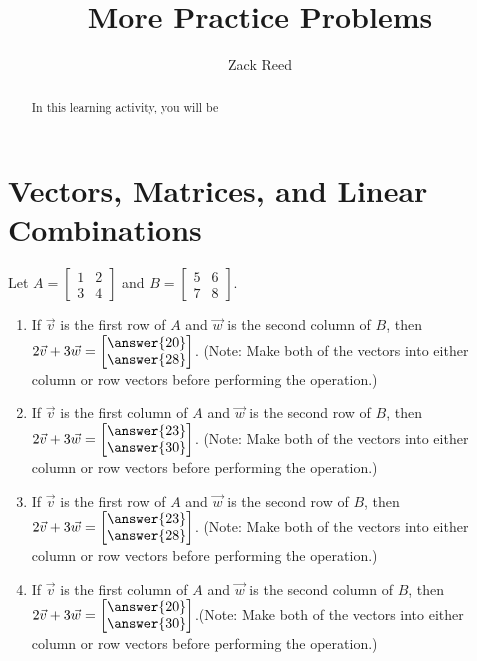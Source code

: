 \documentclass{ximera}
\author{Zack Reed}
\title{More Practice Problems}
\begin{document}
\begin{abstract}

    In this learning activity, you will be 
\end{abstract}
\maketitle



\section*{Vectors, Matrices, and Linear Combinations}

\begin{example}
    Let $A=\begin{bmatrix} 1 & 2 \\ 3 & 4 \end{bmatrix}$ and $B=\begin{bmatrix} 5 & 6 \\ 7 & 8 \end{bmatrix}$. 
    \begin{enumerate}
        \item If $\vec{v}$ is the first row of $A$ and $\vec{w}$ is the second column of $B$, then $2\vec{v}+3\vec{w} = \begin{bmatrix} \answer{20} \\ \answer{28} \end{bmatrix}$. (Note: Make both of the vectors into either column or row vectors before performing the operation.)
        
        \item If $\vec{v}$ is the first column of $A$ and $\vec{w}$ is the second row of $B$, then $2\vec{v}+3\vec{w} = \begin{bmatrix} \answer{23} \\ \answer{30} \end{bmatrix}$. (Note: Make both of the vectors into either column or row vectors before performing the operation.)
        
        \item If $\vec{v}$ is the first row of $A$ and $\vec{w}$ is the second row of $B$, then $2\vec{v}+3\vec{w} = \begin{bmatrix} \answer{23} \\ \answer{28} \end{bmatrix}$. (Note: Make both of the vectors into either column or row vectors before performing the operation.)
        
        \item If $\vec{v}$ is the first column of $A$ and $\vec{w}$ is the second column of $B$, then $2\vec{v}+3\vec{w} = \begin{bmatrix} \answer{20} \\ \answer{30} \end{bmatrix}$.(Note: Make both of the vectors into either column or row vectors before performing the operation.)
    \end{enumerate}
\end{example}
\end{document}

